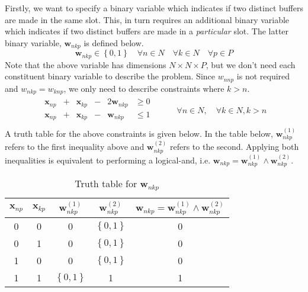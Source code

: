 Firstly, we want to specify a binary variable which indicates if two distinct
buffers are made in the same slot.
This, in turn requires an additional binary variable which indicates if two
distinct buffers are made in a \emph{particular} slot.
The latter binary variable, $ \boldsymbol{w}_{nkp} $ is defined below.
\begin{equation}
    \boldsymbol{w}_{nkp} \in \left\{ 0, 1 \right\} \quad \forall n \in N \quad
    \forall k \in N \quad \forall p \in P
    \label{eq.w}
\end{equation}
Note that the above variable has dimensions $N \times N \times P$, but we don't
need each constituent binary variable to describe the problem.
Since $w_{nnp}$ is not required and $w_{nkp} = w_{knp}$, we only need to
describe constraints where $k > n$.
\begin{equation}
    \begin{split}
        \begin{alignedat}{3}
            \boldsymbol{x}_{np} & {}+{} & \boldsymbol{x}_{kp} & {}-{} & 2
            \boldsymbol{w}_{nkp} & \ge 0\\
            \boldsymbol{x}_{np} & {}+{} & \boldsymbol{x}_{kp} & {}-{} &
            \boldsymbol{w}_{nkp} & \le 1\\
        \end{alignedat}
    \end{split}
    \quad\quad
    \begin{split}
        \forall n \in N, \quad \forall k \in N, k > n
    \end{split}
    \label{eq.constr6}
\end{equation}
A truth table for the above constraints is given below.
In the table below, $\boldsymbol{w}_{nkp}^{\left( 1 \right)}$ refers to the
first inequality above and $\boldsymbol{w}_{nkp}^{\left( 2 \right)}$ refers to
the second.  Applying both inequalities is equivalent to performing a
logical-and, i.e.
$\boldsymbol{w}_{nkp} = \boldsymbol{w}_{nkp}^{\left( 1 \right)} \land
\boldsymbol{w}_{nkp}^{\left( 2 \right)}$.
\begin{table}[h!]
    \centering
    \caption{Truth table for $\boldsymbol{w}_{nkp}$}
    \label{tbl.truthw}
    \begin{tabular}{c c | c c | c}
        $\boldsymbol{x}_{np}$ & $\boldsymbol{x}_{kp}$ &
        $\boldsymbol{w}_{nkp}^{\left( 1 \right)}$ &
        $\boldsymbol{w}_{nkp}^{\left( 2 \right)}$ &
        $\boldsymbol{w}_{nkp} = \boldsymbol{w}_{nkp}^{\left( 1 \right)}
            \land \boldsymbol{w}_{nkp}^{\left( 2 \right)}
        $\\ \hline
        0 & 0 & 0 & $\left\{ 0,1 \right\}$ & 0\\
        0 & 1 & 0 & $\left\{ 0,1 \right\}$ & 0\\
        1 & 0 & 0 & $\left\{ 0,1 \right\}$ & 0\\
        1 & 1 & $\left\{ 0,1 \right\}$ & 1 & 1\\
    \end{tabular}
\end{table}


